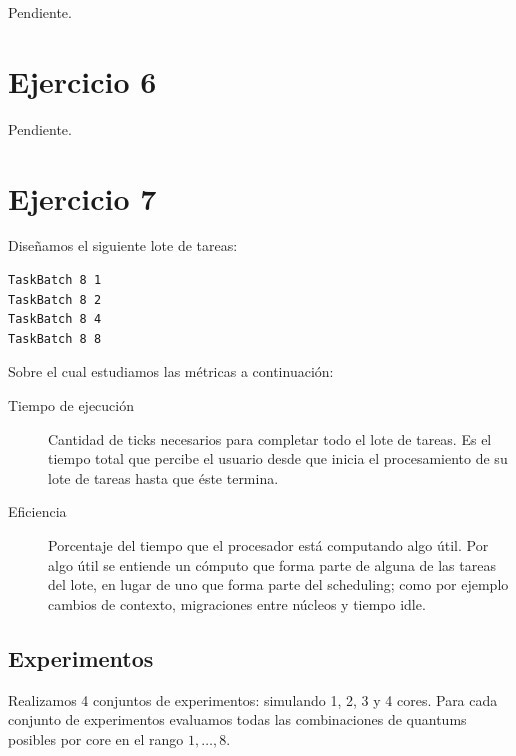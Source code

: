 \documentclass[a4paper,10pt,twoside]{article}
\begin{document}
Pendiente.




\section{Ejercicio 6}

Pendiente.




\section{Ejercicio 7}

Diseñamos el siguiente lote de tareas:

\begin{verbatim}
TaskBatch 8 1
TaskBatch 8 2
TaskBatch 8 4
TaskBatch 8 8
\end{verbatim}

Sobre el cual estudiamos las métricas a continuación:

\begin{description}
	\item[Tiempo de ejecución]
	Cantidad de ticks necesarios para completar todo el lote de tareas. Es el tiempo total que percibe el usuario desde que inicia el procesamiento de su lote de tareas hasta que éste termina.

	\item[Eficiencia]
	Porcentaje del tiempo que el procesador está computando algo útil. Por algo útil se entiende un cómputo que forma parte de alguna de las tareas del lote, en lugar de uno que forma parte del scheduling; como por ejemplo cambios de contexto, migraciones entre núcleos y tiempo idle.
\end{description}


\subsection{Experimentos}

Realizamos 4 conjuntos de experimentos: simulando 1, 2, 3 y 4 cores. Para cada conjunto de experimentos evaluamos todas las combinaciones de quantums posibles por core en el rango $1, \ldots, 8$.
\end{document}
